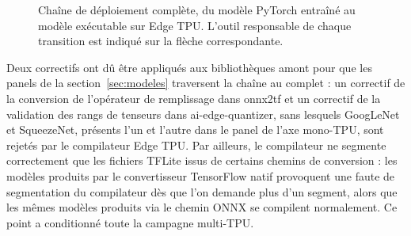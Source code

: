 \documentclass[11pt,a4paper]{report}
\begin{document}
\begin{figure}[H]
\centering
{}
\caption[Chaîne de déploiement PyTorch vers Edge TPU]{Chaîne de déploiement complète, du modèle PyTorch entraîné au modèle exécutable sur Edge TPU. L'outil responsable de chaque transition est indiqué sur la flèche correspondante.}
\label{fig:chaine}
\end{figure}

Deux correctifs ont dû être appliqués aux bibliothèques amont pour que les panels de la section~\ref{sec:modeles} traversent la chaîne au complet : un correctif de la conversion de l'opérateur de remplissage dans onnx2tf et un correctif de la validation des rangs de tenseurs dans ai-edge-quantizer, sans lesquels GoogLeNet et SqueezeNet, présents l'un et l'autre dans le panel de l'axe mono-TPU, sont rejetés par le compilateur Edge TPU. Par ailleurs, le compilateur ne segmente correctement que les fichiers TFLite issus de certains chemins de conversion : les modèles produits par le convertisseur TensorFlow natif provoquent une faute de segmentation du compilateur dès que l'on demande plus d'un segment, alors que les mêmes modèles produits via le chemin ONNX se compilent normalement. Ce point a conditionné toute la campagne multi-TPU.
\end{document}
